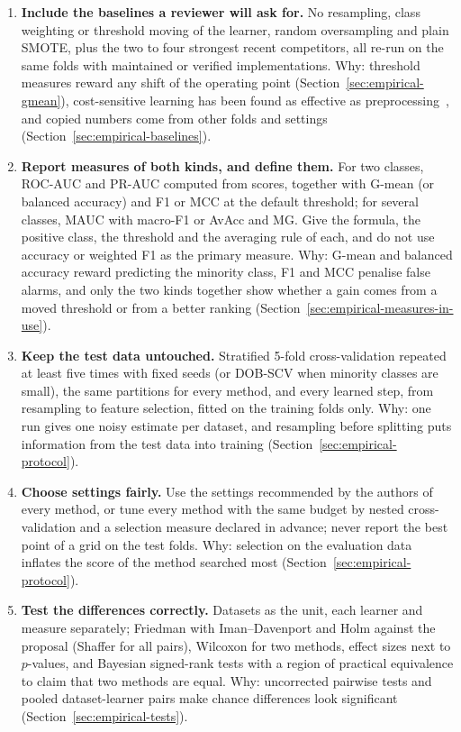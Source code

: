 \begin{enumerate}
  \item \textbf{Include the baselines a reviewer will ask for.} No resampling, class weighting or threshold moving of the learner, random oversampling and plain SMOTE, plus the two to four strongest recent competitors, all re-run on the same folds with maintained or verified implementations. Why: threshold measures reward any shift of the operating point (Section~\ref{sec:empirical-gmean}), cost-sensitive learning has been found as effective as preprocessing~\parencite{lopez2012analysis}, and copied numbers come from other folds and settings (Section~\ref{sec:empirical-baselines}).
  \item \textbf{Report measures of both kinds, and define them.} For two classes, ROC-AUC and PR-AUC computed from scores, together with G-mean (or balanced accuracy) and F1 or MCC at the default threshold; for several classes, MAUC with macro-F1 or AvAcc and MG. Give the formula, the positive class, the threshold and the averaging rule of each, and do not use accuracy or weighted F1 as the primary measure. Why: G-mean and balanced accuracy reward predicting the minority class, F1 and MCC penalise false alarms, and only the two kinds together show whether a gain comes from a moved threshold or from a better ranking (Section~\ref{sec:empirical-measures-in-use}).
  \item \textbf{Keep the test data untouched.} Stratified 5-fold cross-validation repeated at least five times with fixed seeds (or DOB-SCV when minority classes are small), the same partitions for every method, and every learned step, from resampling to feature selection, fitted on the training folds only. Why: one run gives one noisy estimate per dataset, and resampling before splitting puts information from the test data into training (Section~\ref{sec:empirical-protocol}).
  \item \textbf{Choose settings fairly.} Use the settings recommended by the authors of every method, or tune every method with the same budget by nested cross-validation and a selection measure declared in advance; never report the best point of a grid on the test folds. Why: selection on the evaluation data inflates the score of the method searched most (Section~\ref{sec:empirical-protocol}).
  \item \textbf{Test the differences correctly.} Datasets as the unit, each learner and measure separately; Friedman with Iman--Davenport and Holm against the proposal (Shaffer for all pairs), Wilcoxon for two methods, effect sizes next to $p$-values, and Bayesian signed-rank tests with a region of practical equivalence to claim that two methods are equal. Why: uncorrected pairwise tests and pooled dataset-learner pairs make chance differences look significant (Section~\ref{sec:empirical-tests}).

\end{enumerate}
